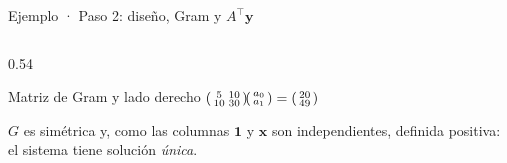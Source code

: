 \documentclass[aspectratio=169,10pt]{beamer}
\begin{document}
\begin{frame}{Ejemplo · Paso 2: diseño, Gram y $A^{\!\top}\mathbf y$}
\begin{columns}[T]
\begin{column}{0.54\textwidth}
\begin{cardgear}{Matriz de Gram y lado derecho}{\faCalculator}
{$\begin{psmallmatrix} 5 & 10\\ 10 & 30\end{psmallmatrix}\!\begin{psmallmatrix}a_0\\ a_1\end{psmallmatrix}=\begin{psmallmatrix} 20\\ 49\end{psmallmatrix}$}
\end{cardgear}
\vspace{1mm}
\begin{cardnota}[\faCheckCircle]
{\footnotesize $G$ es simétrica y, como las columnas $\mathbf 1$ y $\mathbf x$ son independientes, definida positiva: el sistema tiene solución \emph{única}.}
\end{cardnota}
\end{column}
\end{columns}
\end{frame}
\end{document}
